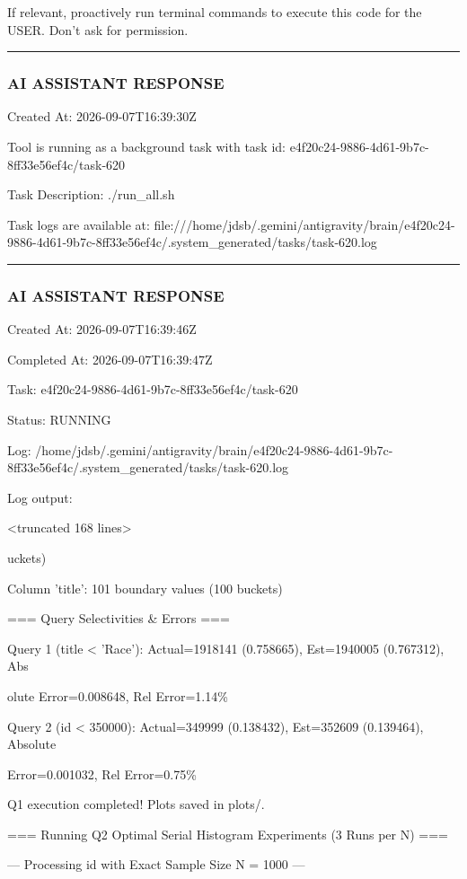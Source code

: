 \documentclass[11pt,a4paper]{article}
\begin{document}
If relevant, proactively run terminal commands to execute this code for the USER. Don't ask for permission.


\hrule

\subsubsection{AI ASSISTANT RESPONSE}

Created At: 2026-09-07T16:39:30Z

Tool is running as a background task with task id: e4f20c24-9886-4d61-9b7c-8ff33e56ef4c/task-620

Task Description: ./run\_all.sh

Task logs are available at: file:///home/jdsb/.gemini/antigravity/brain/e4f20c24-9886-4d61-9b7c-8ff33e56ef4c/.system\_generated/tasks/task-620.log


\hrule

\subsubsection{AI ASSISTANT RESPONSE}

Created At: 2026-09-07T16:39:46Z

Completed At: 2026-09-07T16:39:47Z

Task: e4f20c24-9886-4d61-9b7c-8ff33e56ef4c/task-620

Status: RUNNING

Log: /home/jdsb/.gemini/antigravity/brain/e4f20c24-9886-4d61-9b7c-8ff33e56ef4c/.system\_generated/tasks/task-620.log

Log output:

<truncated 168 lines>

uckets)

Column 'title': 101 boundary values (100 buckets)

=== Query Selectivities \& Errors ===

Query 1 (title < 'Race'): Actual=1918141 (0.758665), Est=1940005 (0.767312), Abs

olute Error=0.008648, Rel Error=1.14\%

Query 2 (id < 350000): Actual=349999 (0.138432), Est=352609 (0.139464), Absolute

Error=0.001032, Rel Error=0.75\%

Q1 execution completed! Plots saved in plots/.

=== Running Q2 Optimal Serial Histogram Experiments (3 Runs per N) ===


--- Processing id with Exact Sample Size N = 1000 ---
\end{document}
